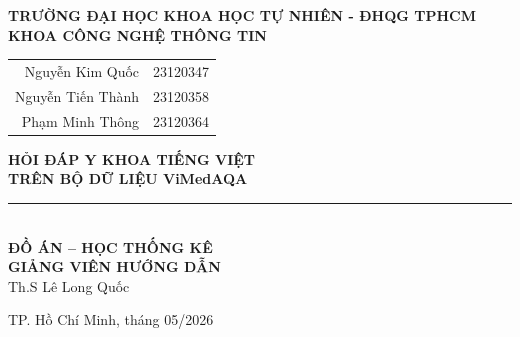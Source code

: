 \begin{titlepage}
  \thispagestyle{empty}
  \centering
  \vspace*{0.8cm}
  {\large\textbf{TRƯỜNG ĐẠI HỌC KHOA HỌC TỰ NHIÊN - ĐHQG TPHCM}}\\[0.35em]
  {\large\textbf{KHOA CÔNG NGHỆ THÔNG TIN}}

  \vspace{1.2cm}
  \begin{tabular}{rl}
    Nguyễn Kim Quốc       & 23120347 \\
    Nguyễn Tiến Thành     & 23120358\\
    Phạm Minh Thông       & 23120364 \\
  \end{tabular}

  \vspace{1.8cm}
  {\Huge\bfseries\color{hcmusblue} HỎI ĐÁP Y KHOA TIẾNG VIỆT}\\[0.5em]
  {\LARGE\bfseries\color{myblue} TRÊN BỘ DỮ LIỆU ViMedAQA}\\[1.2em]
  \rule{12cm}{1.3pt}\\[1.2em]
  {\Large\bfseries ĐỒ ÁN -- HỌC THỐNG KÊ}\\[0.7em]

  \vfill
  {\large\bfseries GIẢNG VIÊN HƯỚNG DẪN}\\[0.5em]
  {\large Th.S Lê Long Quốc}

  \vspace{1.2cm}
  {\small TP. Hồ Chí Minh, tháng 05/2026}
\end{titlepage}
\clearpage
\hypersetup{pageanchor=true}